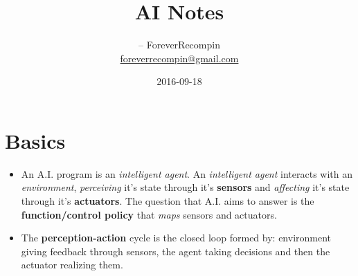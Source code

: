 \documentclass{scrartcl}
\title{AI Notes}
\author{
  -- ForeverRecompin\\
  \href{mailto:foreverrecompin@gmail.com}{foreverrecompin@gmail.com}
}
\date{2016-09-18}
\begin{document}
\maketitle
\clearpage
\tableofcontents
{}
\clearpage
% 
\section{Basics}
\begin{itemize}
\item An A.I. program is an \emph{intelligent agent}. An \emph{intelligent agent} interacts with an \emph{environment}, \emph{perceiving} it's state through it's \textbf{sensors} and \emph{affecting} it's state through it's \textbf{actuators}. The question that A.I. aims to answer is the \textbf{function/control policy} that \emph{maps} sensors and actuators.
\item The \textbf{perception-action} cycle is the closed loop formed by: environment giving feedback through sensors, the agent taking decisions and then the actuator realizing them.
\end{itemize}
\begin{figure}[!h]
  \centering
\end{figure}
\end{document}
